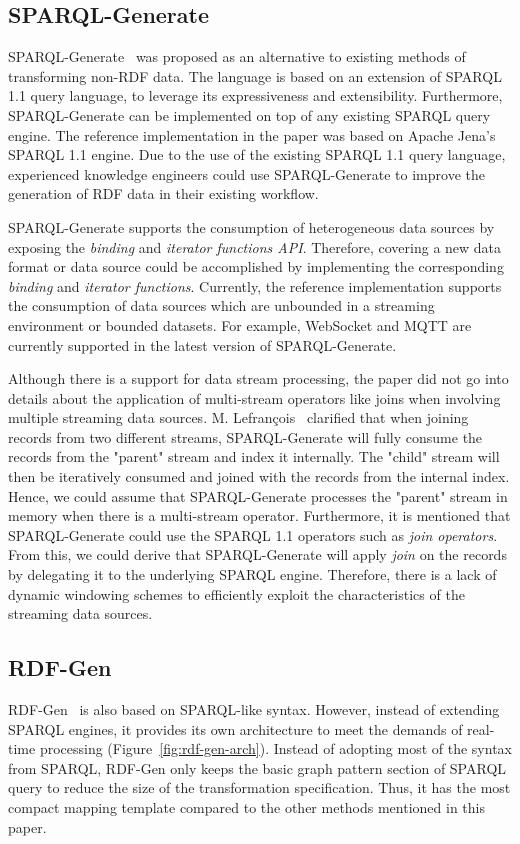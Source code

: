 \subsection{SPARQL-Generate}
SPARQL-Generate~\cite{sparql_generate} was proposed as an alternative to existing methods of 
transforming non-RDF data. The language is based on an extension of SPARQL 1.1 query language, to leverage 
its expressiveness and extensibility. Furthermore, SPARQL-Generate can be implemented on top 
of any existing SPARQL query engine. The reference implementation in the paper was based on Apache Jena's 
SPARQL 1.1 engine. Due to the use of the existing SPARQL 1.1 query language, experienced knowledge engineers could use 
SPARQL-Generate to improve the generation of RDF data in their existing workflow. 

SPARQL-Generate supports the consumption of heterogeneous data sources by exposing the 
\emph{binding} and \emph{iterator functions API}. Therefore, covering a new data format or data source could be accomplished 
by implementing the corresponding \emph{binding} and \emph{iterator functions}. Currently, 
the reference implementation supports the consumption of data sources which are unbounded in a 
streaming environment or bounded datasets. 
For example, WebSocket and MQTT are currently supported in the latest version of SPARQL-Generate. 

Although there is a support for data stream processing, the paper did not go into details 
about the application of multi-stream operators like joins when involving multiple streaming 
data sources. M. Lefran\c{c}ois~\cite{sparql_generate} clarified that when joining
records from two different streams, SPARQL-Generate will fully consume the records 
from the "parent" stream and index it internally. The "child" stream will then be iteratively consumed and 
joined with the records from the internal index. Hence, we could assume that SPARQL-Generate processes the "parent" 
stream in memory when there is a multi-stream operator.
Furthermore, it is mentioned that SPARQL-Generate could use the SPARQL 1.1 operators such as \emph{join operators}. 
From this, we could derive that SPARQL-Generate will apply \emph{join} on the 
records by delegating it to the underlying SPARQL engine.
Therefore, there is a lack of  
dynamic windowing schemes to efficiently exploit the characteristics of the streaming data sources.  

\subsection{RDF-Gen}
RDF-Gen~\cite{rdf_gen} is also based on SPARQL-like syntax. However, instead of extending SPARQL engines, 
it provides its own architecture to meet the demands
of real-time processing (Figure~\ref{fig:rdf-gen-arch}). Instead of adopting most of the syntax from SPARQL, RDF-Gen only 
keeps the basic graph pattern section of SPARQL query to reduce the size of the transformation specification. 
Thus, it has the most compact mapping template compared to the other methods mentioned in this paper. 

